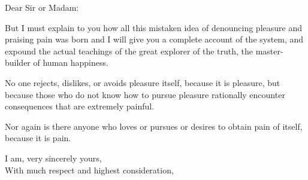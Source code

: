 \documentclass{lettear}
\def\myopening{Dear Sir or Madam}
\begin{document}
\begin{letter}{}%
\opening{\myopening\emdash:}
\phantom{\myopening\emdash:}%
    But I must explain to you how all this mistaken idea of denouncing pleasure and praising pain was born and I will give you a complete account of the system, and expound the actual teachings of the great explorer of the truth, the master-builder of human happiness.

No one rejects, dislikes, or avoids pleasure itself, because it is pleasure, but because those who do not know how to pursue pleasure rationally encounter consequences that are extremely painful.

Nor again is there anyone who loves or pursues or desires to obtain pain of itself, because it is pain.
    
\closing{I am, very sincerely yours,\\ With much respect and highest consideration,}
\end{letter}
\end{document}
